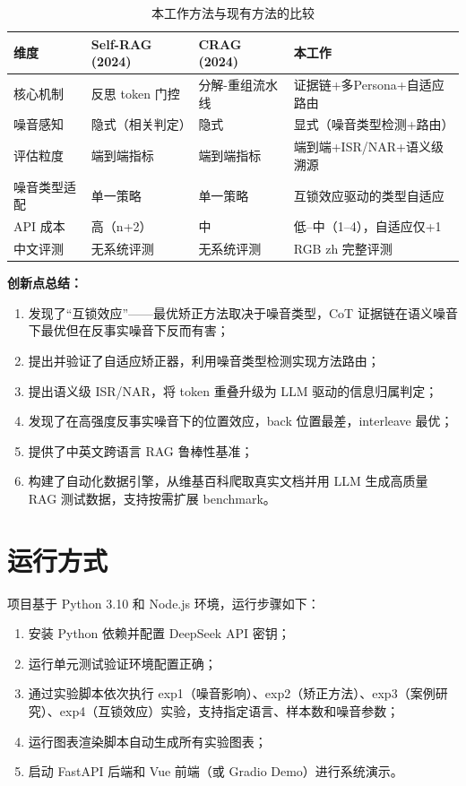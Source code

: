 \documentclass[UTF8,zihao=-4]{ctexart}
\begin{document}
\begin{table}[H]
  \centering
  \caption{本工作方法与现有方法的比较}
  \begin{tabularx}{\textwidth}{lYYY}
    \toprule
    维度 & Self-RAG (2024) & CRAG (2024) & 本工作 \\
    \midrule
    核心机制 & 反思 token 门控 & 分解-重组流水线 & 证据链+多Persona+自适应路由 \\
    噪音感知 & 隐式（相关判定） & 隐式 & 显式（噪音类型检测+路由） \\
    评估粒度 & 端到端指标 & 端到端指标 & 端到端+ISR/NAR+语义级溯源 \\
    噪音类型适配 & 单一策略 & 单一策略 & 互锁效应驱动的类型自适应 \\
    API 成本 & 高（n+2） & 中 & 低--中（1--4），自适应仅+1 \\
    中文评测 & 无系统评测 & 无系统评测 & RGB zh 完整评测 \\
    \bottomrule
  \end{tabularx}
\end{table}

\textbf{创新点总结：}
\begin{enumerate}
  \item 发现了“互锁效应”——最优矫正方法取决于噪音类型，CoT 证据链在语义噪音下最优但在反事实噪音下反而有害；
  \item 提出并验证了自适应矫正器，利用噪音类型检测实现方法路由；
  \item 提出语义级 ISR/NAR，将 token 重叠升级为 LLM 驱动的信息归属判定；
  \item 发现了在高强度反事实噪音下的位置效应，back 位置最差，interleave 最优；
  \item 提供了中英文跨语言 RAG 鲁棒性基准；
  \item 构建了自动化数据引擎，从维基百科爬取真实文档并用 LLM 生成高质量 RAG 测试数据，支持按需扩展 benchmark。
\end{enumerate}

\section{运行方式}

项目基于 Python 3.10 和 Node.js 环境，运行步骤如下：

\begin{enumerate}
  \item 安装 Python 依赖并配置 DeepSeek API 密钥；
  \item 运行单元测试验证环境配置正确；
  \item 通过实验脚本依次执行 exp1（噪音影响）、exp2（矫正方法）、exp3（案例研究）、exp4（互锁效应）实验，支持指定语言、样本数和噪音参数；
  \item 运行图表渲染脚本自动生成所有实验图表；
  \item 启动 FastAPI 后端和 Vue 前端（或 Gradio Demo）进行系统演示。
\end{enumerate}
\end{document}
